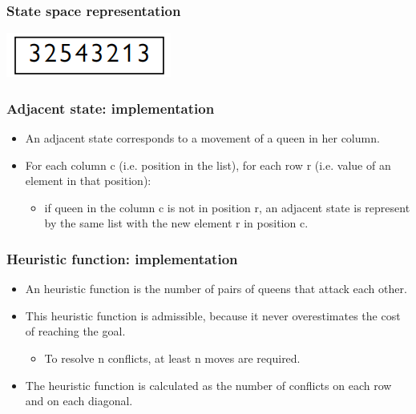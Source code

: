 \documentclass{beamer}
\begin{document}
    \begin{frame}
    \frametitle{State space representation}
        \includegraphics{Images/queens_position.png}
        \centering
    \end{frame}

    \begin{frame}
    \frametitle{Adjacent state: implementation}
        \begin{itemize}
            \item An adjacent state corresponds to a movement of a queen in her column.
            \pause
            \item For each column c (i.e. position in the list), for each row r (i.e. value of an element in that position): 
            \pause
            \begin{itemize}
                \item if queen in the column c is not in position r, an adjacent state is represent by the same list with the new element r in position c.
            \end{itemize}
        \end{itemize}
    \end{frame}

    \begin{frame}
    \frametitle{Heuristic function: implementation}
    \begin{itemize}
        \item An heuristic function is the number of pairs of queens that attack each other.
        \pause 
        \item This heuristic function is admissible, because it never overestimates the cost of reaching the goal.
        \pause
        \begin{itemize}
            \item To resolve n conflicts, at least n moves are required.
        \end{itemize}
        \pause
        \item The heuristic function is calculated as the number of conflicts on each row and on each diagonal.
    \end{itemize}
    \end{frame}
\end{document}
